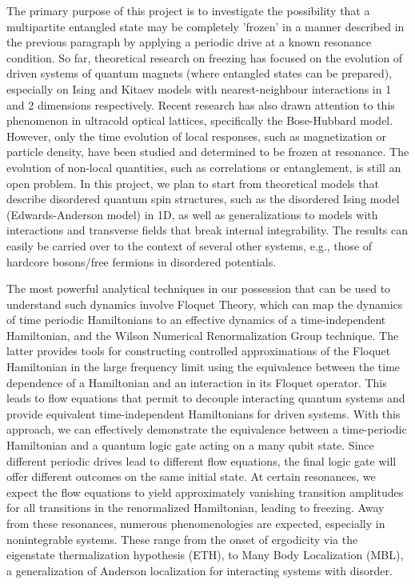 \documentclass[a4paper,9pt]{article}
\begin{document}
The primary purpose of this project is to investigate the possibility that a multipartite entangled state may be completely 'frozen' in a manner described in the previous paragraph by applying a periodic drive at a known resonance condition. So far, theoretical research on freezing has focused on the evolution of driven systems of quantum magnets (where entangled states can be prepared), especially on Ising and Kitaev models with nearest-neighbour interactions in 1 and 2 dimensions respectively. Recent research has also drawn attention to this phenomenon in ultracold optical lattices, specifically the Bose-Hubbard model. However, only the time evolution of local responses, such as magnetization or particle density, have been studied and determined to be frozen at resonance. The evolution of non-local quantities, such as correlations or entanglement, is still an open problem. In this project, we plan to start from theoretical models that describe disordered quantum spin structures, such as the disordered 
Ising model (Edwards-Anderson model) in 1D, as well as generalizations to  models with interactions and transverse fields that break internal integrability. The results can easily be carried over to the context of several other systems, e.g., those of hardcore bosons/free fermions in disordered potentials. 

The most powerful analytical techniques in our possession that can be used to understand such dynamics involve Floquet Theory, which can map the dynamics of time periodic Hamiltonians to an effective dynamics of a time-independent Hamiltonian, and the Wilson Numerical Renormalization Group technique. The latter provides tools for constructing controlled approximations of the Floquet Hamiltonian in the large frequency limit using the equivalence between the time dependence of a Hamiltonian and an interaction in its Floquet operator. This leads to  flow equations that permit to decouple interacting quantum systems and provide equivalent  time-independent Hamiltonians for driven systems. With this approach, we can effectively demonstrate the equivalence between a time-periodic Hamiltonian and a quantum logic gate acting on a many qubit state. Since different periodic drives lead to different flow equations, the final logic gate will offer different outcomes on the same initial state. At certain resonances, we expect the flow equations to yield approximately vanishing transition amplitudes for all transitions in the renormalized Hamiltonian, leading to freezing. Away from these resonances, numerous phenomenologies are expected, especially in nonintegrable systems. These range from the onset of ergodicity via the eigenstate thermalization hypothesis (ETH), to Many Body Localization (MBL), a generalization of Anderson localization for interacting systems with disorder.
\end{document}
